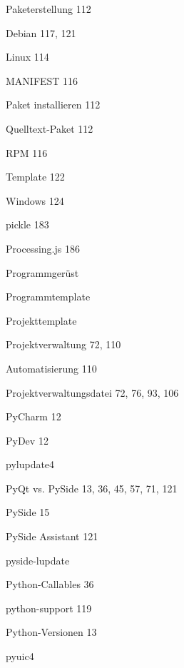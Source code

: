\documentclass{book}
\renewcommand\subitem{\par}
\begin{document}
\begin{multicols}{2}
\begin{osp-index}
  \item Paketerstellung\hspace{1mm} 112
    \subitem Debian\hspace{1mm} 117, 121
    \subitem Linux\hspace{1mm} 114
    \subitem MANIFEST\hspace{1mm} 116
    \subitem Paket installieren\hspace{1mm} 112
    \subitem Quelltext-Paket\hspace{1mm} 112
    \subitem RPM\hspace{1mm} 116
    \subitem Template\hspace{1mm} 122
    \subitem Windows\hspace{1mm} 124
  \item pickle\hspace{1mm} 183
  \item Processing.js\hspace{1mm} 186
  \item Programmger\"ust\hspace{1mm} 
  \item Programmtemplate\hspace{1mm} 
  \item Projekttemplate\hspace{1mm} 
  \item Projektverwaltung\hspace{1mm} 72, 110
    \subitem Automatisierung\hspace{1mm} 110
    \subitem Projektverwaltungsdatei\hspace{1mm} 72, 76, 93, 106
  \item PyCharm\hspace{1mm} 12
  \item PyDev\hspace{1mm} 12
  \item pylupdate4\hspace{1mm} 
  \item PyQt vs. PySide\hspace{1mm} 13, 36, 45, 57, 71, 121
  \item PySide\hspace{1mm} 15
  \item PySide Assistant\hspace{1mm} 121
  \item pyside-lupdate\hspace{1mm} 
  \item Python-Callables\hspace{1mm} 36
  \item python-support\hspace{1mm} 119
  \item Python-Versionen\hspace{1mm} 13
  \item pyuic4\hspace{1mm} 


\end{osp-index}
\end{multicols}
\end{document}
